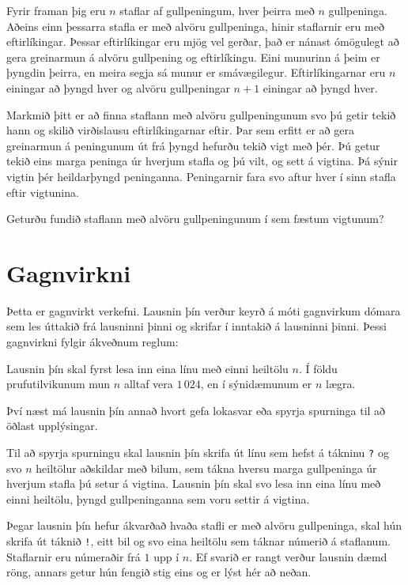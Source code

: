 
Fyrir framan þig eru $n$ staflar af gullpeningum, hver þeirra með $n$ gullpeninga.
Aðeins einn þessarra stafla er með alvöru gullpeninga, hinir staflarnir eru með eftirlíkingar.
Þessar eftirlíkingar eru mjög vel gerðar, það er nánast ómögulegt að gera greinarmun á alvöru gullpening og eftirlíkingu.
Eini munurinn á þeim er þyngdin þeirra, en meira segja sá munur er smávægilegur.
Eftirlíkingarnar eru $n$ einingar að þyngd hver og alvöru gullpeningar $n+1$ einingar að þyngd hver.

Markmið þitt er að finna staflann með alvöru gullpeningunum svo þú getir tekið hann og skilið virðislausu eftirlíkingarnar eftir.
Þar sem erfitt er að gera greinarmun á peningunum út frá þyngd hefurðu tekið vigt með þér.
Þú getur tekið eins marga peninga úr hverjum stafla og þú vilt, og sett á vigtina.
Þá sýnir vigtin þér heildarþyngd peninganna.
Peningarnir fara svo aftur hver í sinn stafla eftir vigtunina.

Geturðu fundið staflann með alvöru gullpeningunum í sem fæstum vigtunum?

\section*{Gagnvirkni}
Þetta er gagnvirkt verkefni. Lausnin þín verður keyrð á móti gagnvirkum dómara
sem les úttakið frá lausninni þinni og skrifar í inntakið á lausninni þinni.
Þessi gagnvirkni fylgir ákveðnum reglum:

Lausnin þín skal fyrst lesa inn eina línu með einni heiltölu $n$.
Í földu prufutilvikunum mun $n$ alltaf vera $1\,024$, en í sýnidæmunum er $n$ lægra.

Því næst má lausnin þín annað hvort gefa lokasvar eða spyrja spurninga til að öðlast upplýsingar.

Til að spyrja spurningu skal lausnin þín skrifa út línu sem hefst á tákninu \texttt{?} og svo $n$
heiltölur aðskildar með bilum, sem tákna hversu marga gullpeninga úr hverjum stafla þú setur á vigtina.
Lausnin þín skal svo lesa inn eina línu með einni heiltölu, þyngd gullpeninganna sem voru settir á vigtina.

Þegar lausnin þín hefur ákvarðað hvaða stafli er með alvöru gullpeninga,
skal hún skrifa út táknið \texttt{!}, eitt bil og svo eina heiltölu sem táknar númerið á staflanum.
Staflarnir eru númeraðir frá $1$ upp í $n$.
Ef svarið er rangt verður lausnin dæmd röng, annars getur hún fengið stig eins og er lýst hér að neðan.


